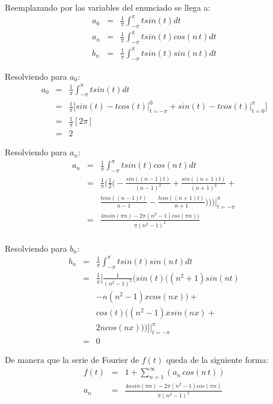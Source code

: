 \documentclass[a4paper]{article}
\begin{document}
Reemplazando por las variables del enunciado se llega a:
\begin{eqnarray*}
a_0 &=& \frac{1}{\pi}\int_{-\pi}^{\pi}tsin(t)dt\\
a_n &=& \frac{1}{\pi}\int_{-\pi}^{\pi}tsin(t)cos(n\,t)dt\\
b_n &=& \frac{1}{\pi}\int_{-\pi}^{\pi}tsin(t)sin(n\,t)dt
\end{eqnarray*}

Resolviendo para $a_0$:
\begin{eqnarray*}
a_0 &=& \frac{1}{\pi}\int_{-\pi}^{\pi}tsin(t)dt\\
&=& \frac{1}{\pi} \bigg[ sin(t) -tcos(t)\bigg|_{t=-\pi}^{0} + sin(t) -tcos(t)\bigg|_{t=0}^{\pi} \bigg] \\
&=& \frac{1}{\pi} [2\pi]\\
&=& 2
\end{eqnarray*}

Resolviendo para $a_n$:
\begin{eqnarray*}
a_n &=& \frac{1}{\pi}\int_{-\pi}^{\pi}tsin(t)cos(n\,t)dt\\
&=& \frac{1}{\pi} \bigg(\frac{1}{2}\bigg(-\frac{sin((n-1)t)}{(n-1)^{2}} + \frac{sin((n+1)t)}{(n+1)^{2}}+ \\
& & \frac{tcos((n-1)t)}{n-1} - \frac{tcos((n+1)t)}{n+1})\bigg)\bigg)\bigg|_{t=-\pi}^{\pi}\\
&=& \frac{4nsin(\pi n)-2\pi(n^{2}-1)cos(\pi n))}{\pi(n^{2}- 1)^{2}}\\
\end{eqnarray*}

Resolviendo para $b_n$:
\begin{eqnarray*}
b_n &=& \frac{1}{\pi}\int_{-\pi}^{\pi}tsin(t)sin(n\,t)dt\\
&=& \frac{1}{\pi} \bigg[\frac{1}{(n^{2}-1)^{2}}(sin(t)((n^{2}+1)sin(nt) \\
& & -n(n^{2}-1)xcos(nx))+ \\
& & cos(t)((n^{2}-1)xsin(nx) + \\
& &2ncos(nx)))\bigg]\bigg|_{t=-\pi}^{\pi}\\
&=& 0
\end{eqnarray*}

De manera que la serie de Fourier de $f(t)$ queda de la siguiente forma:
\begin{eqnarray*}
f(t) &=& 1 + \sum_{n=1}^\infty\left(a_n\,cos(n\,t)\right)\\
a_n &=& \frac{4nsin(\pi n)-2\pi(n^{2}-1)cos(\pi n)}{\pi(n^{2}- 1)^{2}}
\end{eqnarray*}
\end{document}
